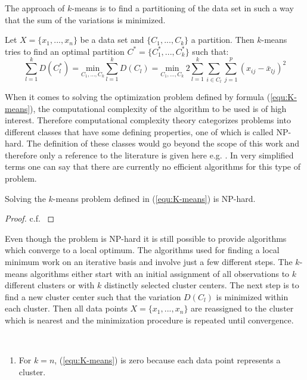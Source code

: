 The approach of $k$-means is to find a partitioning of the data set in such a way that the sum of the variations is minimized.

\begin{definition}[$k$-means]
Let $X = \{x_1, ..., x_n\}$ be a data set and $\{C_1, ..., C_k\}$ a partition. Then $k$-means tries to find an optimal partition $C^* = \{C_1^*, ..., C_k^*\}$ such that: 
	\begin{equation}\label{equ:K-means}
		\sum_{l=1}^k D(C_l^*) = \underset{C_1, \dots, C_k}{\text{min}} \sum_{l=1}^k D(C_l) = \underset{C_1, \dots, C_k}{\text{min}} ~2 \sum_{l=1}^k  \sum_{i \in C_l} \sum_{j=1}^p (x_{ij}- \bar x_{lj})^2
	\end{equation}
\end{definition}

When it comes to solving the optimization problem defined by formula (\ref{equ:K-means}), the computational complexity of the algorithm to be used is of high interest. Therefore computational complexity theory categorizes problems into different classes that have some defining properties, one of which is called NP-hard. The definition of these classes would go beyond the scope of this work and therefore only a reference to the literature is given here e.g. \cite{np_hard_reference}. In very simplified terms one can say that there are currently no efficient algorithms for this type of problem. 


\begin{corollary}
	Solving the $k$-means problem defined in (\ref{equ:K-means}) is NP-hard.
\end{corollary}
\begin{proof}
c.f. \cite{NP_hard}
\end{proof}

Even though the problem is NP-hard it is still possible to provide algorithms which converge to a local optimum. The algorithms used for finding a local minimum work on an iterative basis   and involve just a few different steps. The $k$-means algorithms either start with an initial assignment of all observations to $k$ different clusters or with $k$ distinctly selected cluster centers. The next step is to find a new cluster center such that the variation $D(C_l)$ is minimized within each cluster. Then all data points $X = \{x_1, ..., x_n\}$ are reassigned to the cluster which is nearest and the minimization procedure is repeated until convergence. 

\begin{remark}~	
	\begin{enumerate}[label=(\roman*)]
		\item  For $k=n$, (\ref{equ:K-means}) is zero because each data point represents a cluster. 
	\end{enumerate}
\end{remark}

